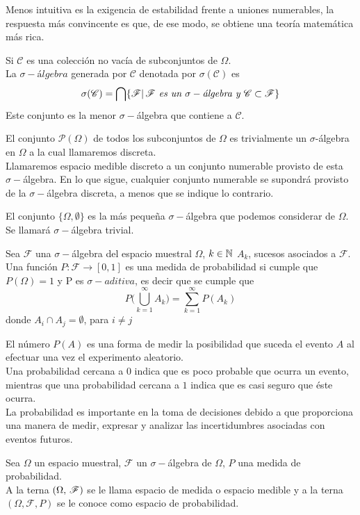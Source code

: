Menos intuitiva es la exigencia de estabilidad frente a uniones numerables, la respuesta más
convincente es que, de ese modo, se obtiene una teoría matemática más rica.
\begin{Def}
    Si $\mathscr{C}$ es una colección no vacía de subconjuntos de $\Omega$.\\La $\sigma-\textit{álgebra}$ generada por $\mathscr{C}$ denotada por $\sigma(\mathscr{C})$ es $$\sigma(\mathscr{C})=\bigcap\{\mathscr{F}|\thinspace\mathscr{F} \textit{ es un }\sigma-\textit{álgebra y }  \mathscr{C}\subset\mathscr{F}\}$$
    Este conjunto es la menor $\sigma-$álgebra que contiene a $\mathscr{C}$.
\end{Def}
\begin{Ejm}
    El conjunto $\mathscr{P}(\Omega)$ de todos los subconjuntos de $\Omega$ es trivialmente un $\sigma$-álgebra en $\Omega$ a la cual llamaremos discreta. \\ Llamaremos espacio medible discreto a un conjunto numerable provisto de esta $\sigma-$álgebra. En lo que sigue, cualquier conjunto numerable se supondrá provisto de la $\sigma-$álgebra discreta, a menos que se indique lo contrario.
\end{Ejm}
\begin{Ejm}
    El conjunto $\{\Omega, \emptyset\}$ es la más pequeña $\sigma-$álgebra que podemos considerar de $\Omega$. Se llamará $\sigma-$álgebra trivial.
\end{Ejm}
\begin{Def}
    \label{def-medidaProbabilidad}
    Sea $\mathscr{F}$ una $\sigma-$álgebra del espacio muestral $\Omega$, $k\in{\mathbb{N}}$ $A_k$, sucesos asociados a $\mathscr{F}$.
    Una función $P:\mathscr{F}\rightarrow [0,1]$ es una medida de probabilidad si cumple que $P(\Omega)=1$ y P es $\sigma-aditiva$, es decir que se cumple que $$P\big(\bigcup_{k=1}^\infty A_k\big)=\sum_{k=1}^\infty P(A_k)$$
    donde $A_i\cap A_j=\emptyset$, para $i\not= j$
\end{Def}
El número $P(A)$ es una forma de medir la posibilidad que suceda el evento $A$ al efectuar una vez el experimento aleatorio.\\
Una probabilidad cercana a $0$ indica que es poco probable que ocurra un evento, mientras que una probabilidad cercana a $1$ indica que es casi seguro que éste ocurra.\\
La probabilidad es importante en la toma de decisiones debido a que proporciona una manera de medir, expresar y analizar las incertidumbres asociadas con eventos futuros.
\begin{Def}
    Sea $\Omega$ un espacio muestral, $\mathscr{F}$ un $\sigma-$álgebra de $\Omega$, $P$ una medida de probabilidad.\\
    A la terna $(\Omega,\thinspace\mathscr{F})$ se le llama espacio de medida o espacio medible y a la terna $(\Omega,\mathscr{F},P)$ se le conoce como espacio de probabilidad.
\end{Def}